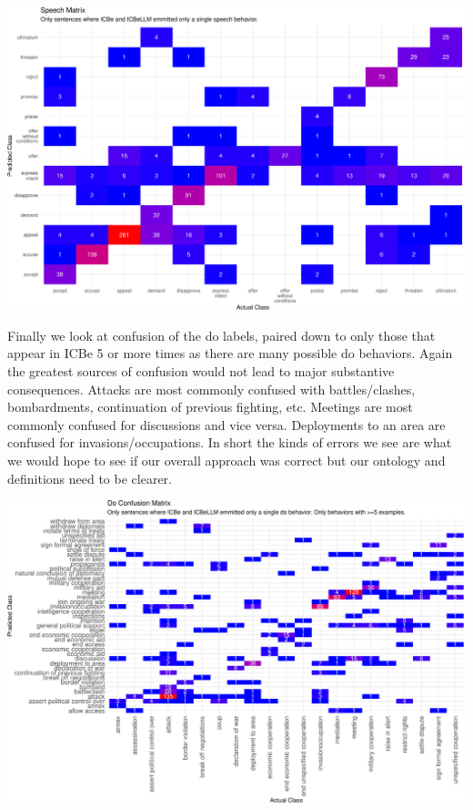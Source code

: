 \documentclass[
]{article}
\begin{document}
\includegraphics{arxiv_Douglass_et_al_2024_ICBeLLM_files/figure-pdf/unnamed-chunk-11-1.pdf}

Finally we look at confusion of the do labels, paired down to only those
that appear in ICBe 5 or more times as there are many possible do
behaviors. Again the greatest sources of confusion would not lead to
major substantive consequences. Attacks are most commonly confused with
battles/clashes, bombardments, continuation of previous fighting, etc.
Meetings are most commonly confused for discussions and vice versa.
Deployments to an area are confused for invasions/occupations. In short
the kinds of errors we see are what we would hope to see if our overall
approach was correct but our ontology and definitions need to be
clearer.

\includegraphics{arxiv_Douglass_et_al_2024_ICBeLLM_files/figure-pdf/unnamed-chunk-13-1.pdf}
\end{document}
